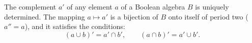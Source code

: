 The complement $a'$ of any element $a$ of a Boolean algebra $B$ is uniquely determined. The mapping $a \mapsto a'$ is a bijection of $B$ onto itself of period two ($a'' = a$), and it satisfies the conditions:
$$(a \cup b)' = a' \cap b', \qquad (a \cap b)' = a' \cup b'.$$
